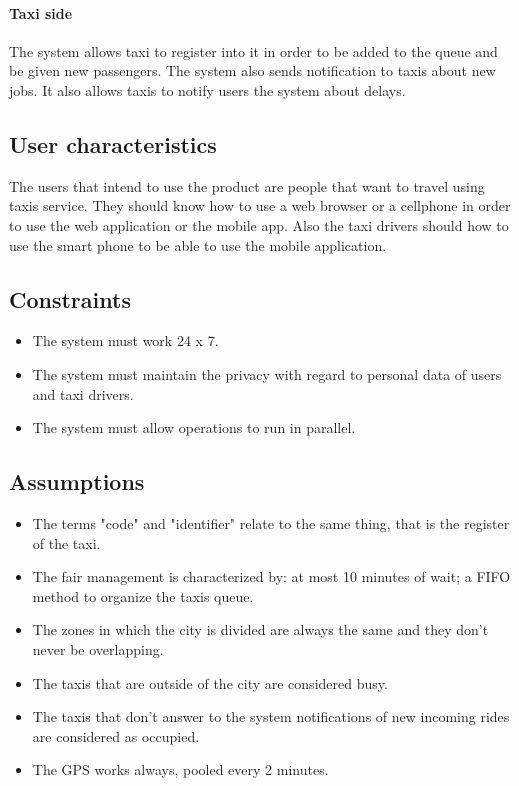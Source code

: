 		\paragraph{Taxi side}The system allows taxi to register into it in order to be added to the queue and be given new passengers. The system also sends notification to taxis about new jobs. It also allows taxis to notify users the system about delays.
	\subsection{User characteristics}
    The users that intend to use the product are people that want to travel using taxis service. They should know how to use a web browser or a cellphone in order to use the web application or the mobile app. 
    Also the taxi drivers should how to use the smart phone to be able to use the mobile application.
	\subsection{Constraints}
	    \begin{itemize}
	    \item The system must work 24 x 7.
	    \item The system must maintain the privacy with regard to personal data of users and taxi drivers.
	    \item The system must allow operations to run in parallel.
	    \end{itemize}
	\subsection{Assumptions}
	    \begin{itemize}
	    \item The terms "code" and "identifier" relate to the same thing, that is the register of the taxi.
	    \item The fair management is characterized by: at most 10 minutes of wait; a FIFO method to organize the taxis queue.
	    \item The zones in which the city is divided are always the same and they don't never be overlapping.
	    \item The taxis that are outside of the city are considered busy.
	    \item The taxis that don't answer to the system notifications of new incoming rides are considered as occupied.
	    \item The GPS works always, pooled every 2 minutes.
	    \end{itemize}